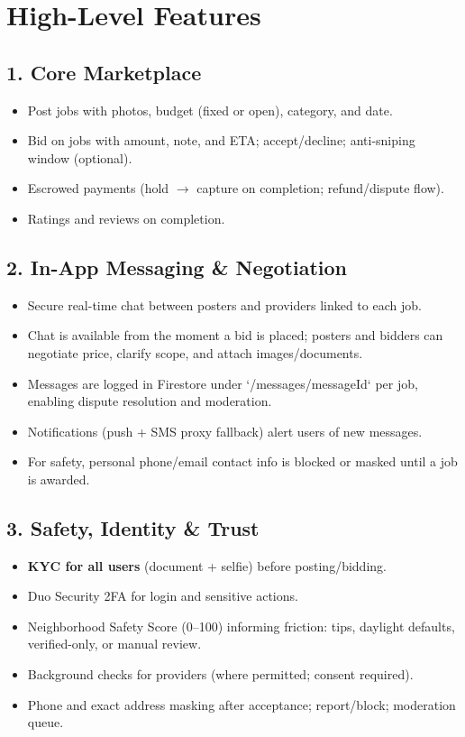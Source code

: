 \documentclass[11pt]{article}
\begin{document}
\section{High-Level Features}
\subsection*{1. Core Marketplace}
\begin{itemize}[leftmargin=1.4em]
  \item Post jobs with photos, budget (fixed or open), category, and date.
  \item Bid on jobs with amount, note, and ETA; accept/decline; anti-sniping window (optional).
  \item Escrowed payments (hold $\rightarrow$ capture on completion; refund/dispute flow).
  \item Ratings and reviews on completion.
\end{itemize}

\subsection*{2. In-App Messaging \& Negotiation}
\begin{itemize}[leftmargin=1.4em]
  \item Secure real-time chat between posters and providers linked to each job.
  \item Chat is available from the moment a bid is placed; posters and bidders can negotiate price, clarify scope, and attach images/documents.
  \item Messages are logged in Firestore under `/messages/{messageId}` per job, enabling dispute resolution and moderation.
  \item Notifications (push + SMS proxy fallback) alert users of new messages.
  \item For safety, personal phone/email contact info is blocked or masked until a job is awarded.
\end{itemize}

\subsection*{3. Safety, Identity \& Trust}
\begin{itemize}[leftmargin=1.4em]
  \item \textbf{KYC for all users} (document + selfie) before posting/bidding.
  \item Duo Security 2FA for login and sensitive actions.
  \item Neighborhood Safety Score (0--100) informing friction: tips, daylight defaults, verified-only, or manual review.
  \item Background checks for providers (where permitted; consent required).
  \item Phone and exact address masking after acceptance; report/block; moderation queue.
\end{itemize}
\end{document}
